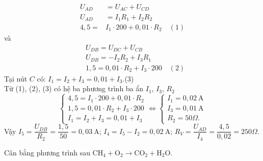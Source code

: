 \begin{bt}
\begin{vd}
{$$\begin{aligned}
		U_{A D} &=U_{A C}+U_{C D} \\
		U_{A D} &=I_1 R_1+I_2 R_2 \\
		4{,}5=& I_1 \cdot 200+0{,}01 \cdot R_2 \quad(1)
			\end{aligned}$$
và $$			\begin{aligned}
		& U_{D B}=U_{D C}+U_{C B} \\
		& U_{D B}=-I_2 R_2+I_3 R_1 \\
		& 1,5=0,01 \cdot R_2+I_3 \cdot 200\quad(2)
	\end{aligned}
	$$
	Tại nút $C$ có:
	$	I_1=I_2+I_3=0{,}01+I_3$.\quad(3)\\
Từ  (1), (2), (3) có hệ ba phương trình ba ẩn $I_1$, $I_3$, $R_2$
	$$
	\left\{\begin{array} { l } 
		{ 4 , 5 = I _ { 1 } \cdot 2 0 0 + 0 , 0 1 \cdot R _ { 2 } } \\
		{ 1 , 5 = 0 , 0 1 \cdot R _ { 2 } + I _ { 3 } \cdot 2 0 0 } \\
		{ I _ { 1 } = I _ { 2 } + I _ { 3 } = 0 , 0 1 + I _ { 3 } }
	\end{array} \Leftrightarrow \left\{\begin{array}{l}
		I_1=0{,}02 \mathrm{~A} \\
		I_3=0{,}01 \mathrm{~A} \\
		R_2=50 \Omega.
	\end{array}\right.\right.
	$$
Vậy $I_5=\dfrac{U_{D B}}{R_2}=\dfrac{1{,}5}{50}=0{,}03 \mathrm{~A}$; $I_4=I_5-I_2=0{,}02 \mathrm{~A}$;
		$ R_V=\dfrac{U_{A D}}{I_4}=\dfrac{4{,}5}{0{,}02}=250 \Omega$.
}
	\end{vd}
\begin{vd}%
	Cân bằng phương trình sau
$\mathrm{CH}_4+\mathrm{O}_2\rightarrow\mathrm{CO}_2+\mathrm{H}_2 \mathrm{O}$.
\end{vd}
\end{bt}
